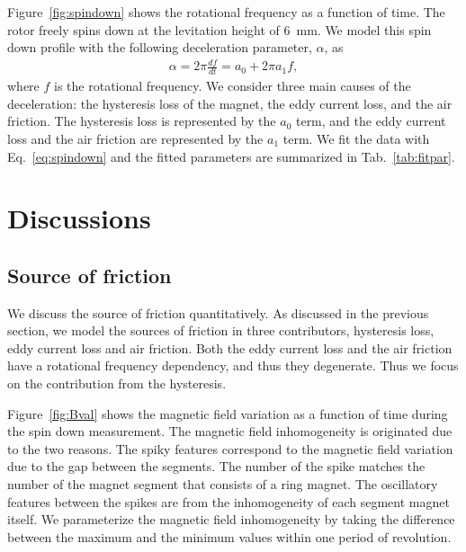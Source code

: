 \documentclass[journal]{IEEEtran}
\begin{document}
Figure~\ref{fig:spindown} shows the rotational frequency as a function of time.
The rotor freely spins down at the levitation height of 6~mm.
We model this spin down profile with the following deceleration parameter, $\alpha$, as
\begin{eqnarray}
\alpha = 2\pi \frac{df}{dt} = a_0 + 2\pi a_1 f,
\label{eq:spindown}
\end{eqnarray}
where $f$ is the rotational frequency\cite{hull_review}.
We consider three main causes of the deceleration: the hysteresis loss of the magnet, the eddy current loss, and the air friction.
The hysteresis loss is represented by the $a_0$ term, and the eddy current loss and the air friction are represented by the $a_1$ term.
We fit the data with Eq.~\ref{eq:spindown} and the fitted parameters are summarized in Tab.~\ref{tab:fitpar}.

\section{Discussions}

\subsection{Source of friction}
We discuss the source of friction quantitatively. 
As discussed in the previous section, we model the sources of friction in three contributors, hysteresis loss, eddy current loss and air friction. 
Both the eddy current loss and the air friction have a rotational frequency dependency, and thus they degenerate. 
Thus we focus on the contribution from the hysteresis. 

Figure~\ref{fig:Bval} shows the magnetic field variation as a function of time during the spin down measurement.
The magnetic field inhomogeneity is originated due to the two reasons.
The spiky features correspond to the magnetic field variation due to the gap between the segments.
The number of the spike matches the number of the magnet segment that consists of a ring magnet.
The oscillatory features between the spikes are from the inhomogeneity of each segment magnet itself. 
We parameterize the magnetic field inhomogeneity by taking the difference between the maximum and the minimum values within one period of revolution.
\end{document}
